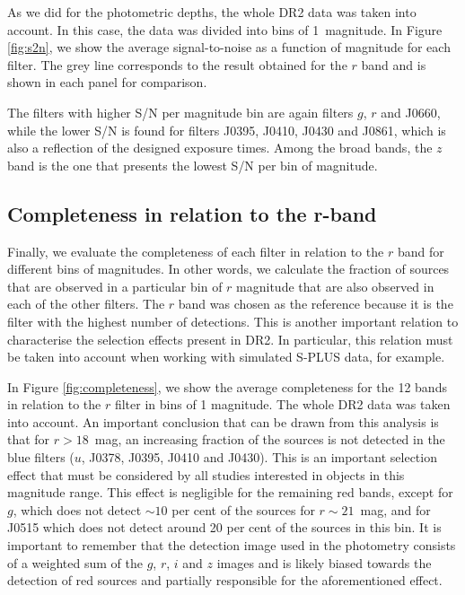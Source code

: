 \documentclass[fleqn,usenatbib]{mnras}
\begin{document}
As we did for the photometric depths, the whole DR2 data was taken into account. In this case, the data was divided into bins of 1~magnitude. In Figure \ref{fig:s2n}, we show the average signal-to-noise as a function of magnitude for each filter. The grey line corresponds to the result obtained for the $r$ band and is shown in each panel for comparison. 

The filters with higher S/N per magnitude bin are again filters $g$, $r$ and J0660, while the lower S/N is found for filters J0395, J0410, J0430 and J0861, which is also a reflection of the designed exposure times. Among the broad bands, the $z$ band is the one that presents the lowest S/N per bin of magnitude.


\subsection{Completeness in relation to the r-band}

Finally, we evaluate the completeness of each filter in relation to the $r$ band for different bins of magnitudes. In other words, we calculate the fraction of sources that are observed in a particular bin of $r$ magnitude that are also observed in each of the other filters. The $r$ band was chosen as the reference because it is the filter with the highest number of detections. This is another important relation to characterise the selection effects present in DR2. In particular, this relation must be taken into account when working with simulated S-PLUS data, for example. 

In Figure \ref{fig:completeness}, we show the average completeness for the 12 bands in relation to the $r$ filter in bins of 1 magnitude. The whole DR2 data was taken into account. An important conclusion that can be drawn from this analysis is that for $r > 18$~mag, an increasing fraction of the sources is not detected in the blue filters ($u$, J0378, J0395, J0410 and J0430). This is an important selection effect that must be considered by all studies interested in objects in this magnitude range. This effect is negligible for the remaining red bands, except for $g$, which does not detect $\sim 10$ per cent of the sources for $r \sim 21$~mag, and for J0515 which does not detect around 20 per cent of the sources in this bin. It is important to remember that the detection image used in the photometry consists of a weighted sum of the $g$, $r$, $i$ and $z$ images and is likely biased towards the detection of red sources and partially responsible for the aforementioned effect.
\end{document}
